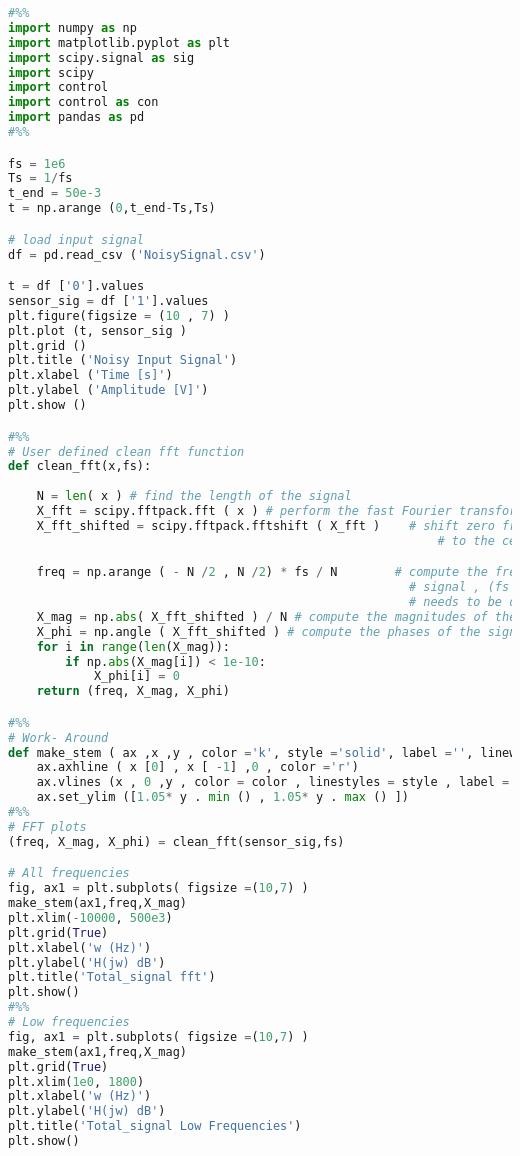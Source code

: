 \documentclass[12pt]{report}
\begin{document}
\begin{lstlisting}[language=Python, caption= Lab 6 code]
#%%
import numpy as np
import matplotlib.pyplot as plt
import scipy.signal as sig
import scipy
import control
import control as con
import pandas as pd
#%%

fs = 1e6
Ts = 1/fs
t_end = 50e-3
t = np.arange (0,t_end-Ts,Ts)

# load input signal
df = pd.read_csv ('NoisySignal.csv')

t = df ['0'].values
sensor_sig = df ['1'].values
plt.figure(figsize = (10 , 7) )
plt.plot (t, sensor_sig )
plt.grid ()
plt.title ('Noisy Input Signal')
plt.xlabel ('Time [s]')
plt.ylabel ('Amplitude [V]')
plt.show ()

#%%
# User defined clean fft function 
def clean_fft(x,fs):
    
    N = len( x ) # find the length of the signal
    X_fft = scipy.fftpack.fft ( x ) # perform the fast Fourier transform (fft)
    X_fft_shifted = scipy.fftpack.fftshift ( X_fft )    # shift zero frequency components
                                                            # to the center of the spectrum

    freq = np.arange ( - N /2 , N /2) * fs / N        # compute the frequencies for the output
                                                        # signal , (fs is the sampling frequency and
                                                        # needs to be defined previously in your code
    X_mag = np.abs( X_fft_shifted ) / N # compute the magnitudes of the signal
    X_phi = np.angle ( X_fft_shifted ) # compute the phases of the signal
    for i in range(len(X_mag)):
        if np.abs(X_mag[i]) < 1e-10:
            X_phi[i] = 0
    return (freq, X_mag, X_phi)

#%%
# Work- Around
def make_stem ( ax ,x ,y , color ='k', style ='solid', label ='', linewidths =2.5 ,** kwargs) :
    ax.axhline ( x [0] , x [ -1] ,0 , color ='r')
    ax.vlines (x , 0 ,y , color = color , linestyles = style , label = label , linewidths = linewidths )
    ax.set_ylim ([1.05* y . min () , 1.05* y . max () ])
#%%
# FFT plots
(freq, X_mag, X_phi) = clean_fft(sensor_sig,fs) 

# All frequencies
fig, ax1 = plt.subplots( figsize =(10,7) )
make_stem(ax1,freq,X_mag)
plt.xlim(-10000, 500e3)
plt.grid(True)
plt.xlabel('w (Hz)')
plt.ylabel('H(jw) dB')
plt.title('Total_signal fft')
plt.show()
#%%
# Low frequencies
fig, ax1 = plt.subplots( figsize =(10,7) )
make_stem(ax1,freq,X_mag)
plt.grid(True)
plt.xlim(1e0, 1800)
plt.xlabel('w (Hz)')
plt.ylabel('H(jw) dB')
plt.title('Total_signal Low Frequencies')
plt.show()


\end{lstlisting}
\end{document}

